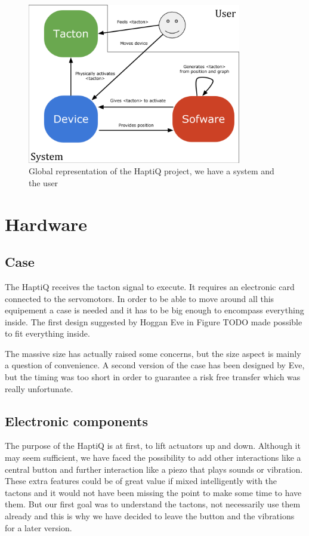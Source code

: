 \begin{figure}[!ht]
  \centering
  \includegraphics[height=7cm]{figures/haptiq_global.png}
  \caption{Global representation of the HaptiQ project, we have a system and the user}
\end{figure}

\section{Hardware}\label{design-of-the-hardware}

\subsection{Case}\label{case}

The HaptiQ receives the tacton signal to execute. It requires an electronic card connected to the servomotors. In order to be able to move around all this equipement a case is needed and it has to be big enough to encompass everything inside. The first design suggested by Hoggan Eve in Figure TODO made possible to fit everything inside. 

The massive size has actually raised some concerns, but the size aspect is mainly a question of convenience. A second version of the case has been designed by Eve, but the timing was too short in order to guarantee a risk free transfer which was really unfortunate.

\subsection{Electronic components}

The purpose of the HaptiQ is at first, to lift actuators up and down. Although it may seem sufficient, we have faced the possibility to add other interactions like a central button and further interaction like a piezo that plays sounds or vibration. These extra features could be of great value if mixed intelligently with the tactons and it would not have been missing the point to make some time to have them. But our first goal was to understand the tactons, not necessarily use them already and this is why we have decided to leave the button and the vibrations for a later version.

